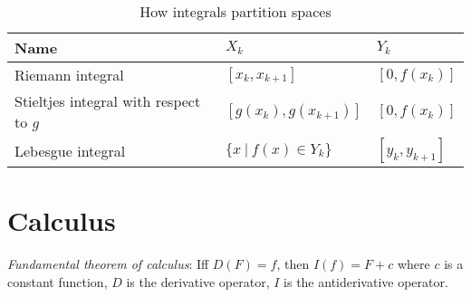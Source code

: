 \begin{table}[h]
    \caption{How integrals partition spaces}
    \label{tab:integral}
    \centering
\begin{tabular}{lll}
    Name & \(X_k\) & \(Y_k\)
    \\
    \hline
    Riemann integral & \( [x_k,x_{k+1}]\) & \( [0,f(x_k)]\)
    \\
    Stieltjes integral with respect to \(g\) & \( [g(x_k),g(x_{k+1})]\) & \( [0,f(x_k)]\)
    \\
    Lebesgue integral & \( \{x ~|~ f(x) \in Y_k\}\) & \( [y_k,y_{k+1}]\)
\end{tabular}
\end{table}

\section{Calculus}

%
\emph{Fundamental theorem of calculus}:
Iff \(D(F) = f\), then \(I(f) = F + c\) where \(c\) is a constant function,
\(D\) is the derivative operator, \(I\) is the antiderivative operator.
